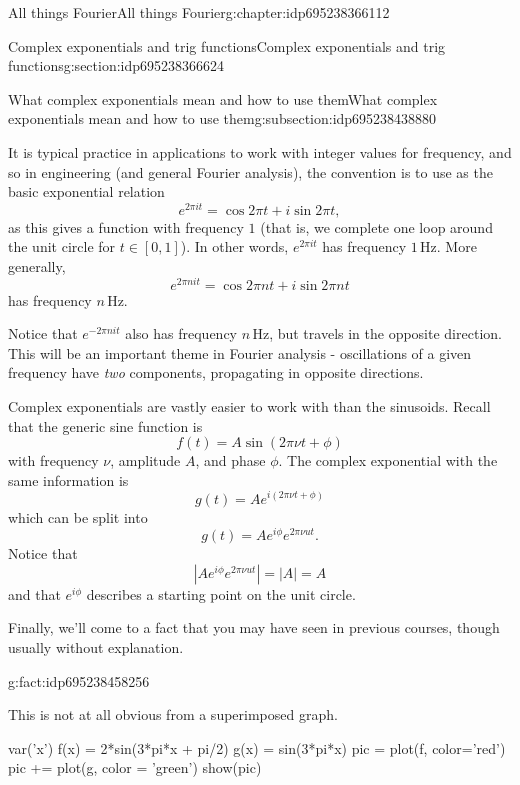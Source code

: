 \documentclass[oneside,10pt,]{book}
\numberwithin{equation}{section}
\newcommand{\abs}[1]{\left\vert#1\right\vert}
\numberwithin{equation}{section}
\newcommand{\hz}{\,\mathrm{Hz}}
\begin{document}
\begin{chapterptx}{All things Fourier}{}{All things Fourier}{}{}{g:chapter:idp695238366112}
\begin{sectionptx}{Complex exponentials and trig functions}{}{Complex exponentials and trig functions}{}{}{g:section:idp695238366624}
\begin{subsectionptx}{What complex exponentials mean and how to use them}{}{What complex exponentials mean and how to use them}{}{}{g:subsection:idp695238438880}
\par
It is typical practice in applications to work with integer values for frequency, and so in engineering (and general Fourier analysis), the convention is to use as the basic exponential relation%
\begin{equation*}
e^{2\pi i t} = \cos 2\pi t + i \sin 2\pi t,
\end{equation*}
as this gives a function with frequency \(1\) (that is, we complete one loop around the unit circle for \(t \in [0,1]\)). In other words, \(e^{2\pi i t}\) has frequency \(1 \hz\). More generally,%
\begin{equation*}
e^{2\pi n i t} = \cos{2 \pi n t} + i \sin 2\pi n t
\end{equation*}
has frequency \(n \hz\).%
\par
Notice that \(e^{-2\pi n i t}\) also has frequency \(n \hz\), but travels in the opposite direction. This will be an important theme in Fourier analysis - oscillations of a given frequency have \emph{two} components, propagating in opposite directions.%
\par
Complex exponentials are vastly easier to work with than the sinusoids. Recall that the generic sine function is%
\begin{equation*}
f(t) = A \sin(2 \pi \nu t + \phi)
\end{equation*}
with frequency \(\nu\), amplitude \(A\), and phase \(\phi\). The complex exponential with the same information is%
\begin{equation*}
g(t) = A e^{i(2\pi \nu t + \phi)}
\end{equation*}
which can be split into%
\begin{equation*}
g(t) = Ae^{i\phi} e^{2 \pi \nu u t}.
\end{equation*}
Notice that%
\begin{equation*}
\abs{Ae^{i\phi} e^{2 \pi \nu u t}} = \abs{A} = A
\end{equation*}
and that \(e^{i\phi}\) describes a starting point on the unit circle.%
\par
Finally, we'll come to a fact that you may have seen in previous courses, though usually without explanation. \begin{fact}{}{}{g:fact:idp695238458256}%
\end{fact}
 This is not at all obvious from a superimposed graph.%
\begin{sageinput}
var('x')
f(x) = 2*sin(3*pi*x + pi/2)
g(x) = sin(3*pi*x)
pic = plot(f, color='red')
pic += plot(g, color = 'green')
show(pic)

\end{sageinput}
\end{subsectionptx}
\end{sectionptx}
\end{chapterptx}
\end{document}
